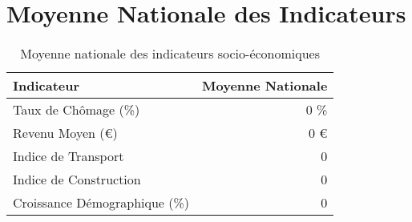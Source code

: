 \documentclass[
]{article}
\begin{document}
\section{\texorpdfstring{\textbf{Moyenne Nationale des
Indicateurs}}{Moyenne Nationale des Indicateurs}}\label{moyenne-nationale-des-indicateurs}

\begin{table}[h]
\centering
\renewcommand{\arraystretch}{1.3}
\begin{tabular}{|l|r|}
\hline
Indicateur & Moyenne Nationale \\
\hline
Taux de Chômage (\%) & 0 \% \\
Revenu Moyen (€) & 0 € \\
Indice de Transport & 0 \\
Indice de Construction  & 0 \\
Croissance Démographique (\%) & 0 \\
\hline
\end{tabular}
\caption{Moyenne nationale des indicateurs socio-économiques}
\end{table}
\end{document}
